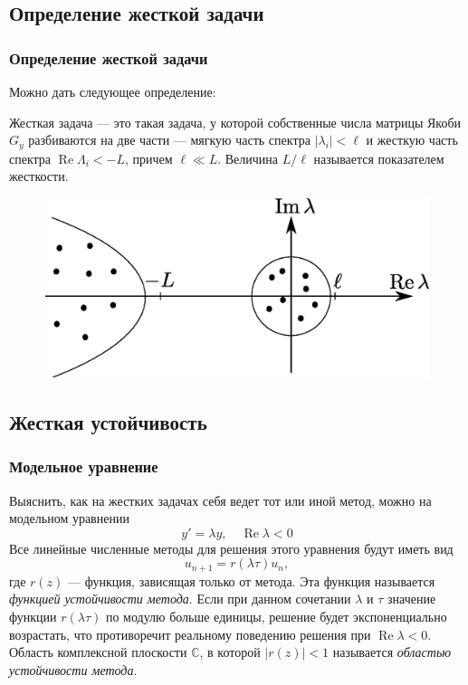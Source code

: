 \documentclass[professionalfonts,compress,unicode,aspectratio=169]{beamer}
\begin{document}
\subsection{Определение жесткой задачи}
\begin{frame}\frametitle{Определение жесткой задачи}
	Можно дать следующее определение:

	Жесткая задача --- это такая задача, у которой собственные числа матрицы Якоби $G_y$
	разбиваются на две части --- мягкую часть спектра $|\lambda_i| < \ell$ и
жесткую часть спектра $\operatorname{Re} \Lambda_i < -L$, причем $\ell \ll L$.
Величина $L/\ell$ называется показателем жесткости.
	\begin{figure}%
	\includegraphics[height=.6\textheight]{sp.eps}%
	\caption{}%
	\label{}%
	\end{figure}
\end{frame}

\subsection{Жесткая устойчивость}
\begin{frame}\frametitle{Модельное уравнение}
	Выяснить, как на жестких задачах себя ведет тот или иной метод, можно на модельном уравнении
	\[
	y' = \lambda y,\quad \operatorname{Re} \lambda < 0
	\]
	Все линейные численные методы для решения этого уравнения будут иметь вид
	\[
	u_{n+1} = r(\lambda \tau) u_n,
	\]
	где $r(z)$ --- функция, зависящая только от метода. Эта функция называется
\emph{функцией устойчивости метода}.
	Если при данном сочетании $\lambda$ и $\tau$ значение функции $r(\lambda \tau)$ по модулю больше единицы, решение будет экспоненциально возрастать, что
	противоречит реальному поведению решения при $\operatorname{Re} \lambda < 0$.
	Область комплексной плоскости $\mathbb{C}$, в которой $|r(z)| < 1$
называется \emph{областью устойчивости метода}.
\end{frame}
\end{document}

